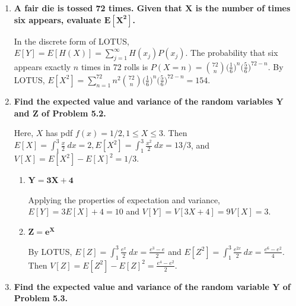 \documentclass[10pt, oneside]{article}
\begin{document}
\begin{enumerate}[label=7.\arabic*]
\item  \begin{tcolorbox}[
  colback=Cerulean!5!white,
  colframe=Cerulean!75!black]
  \textbf{A fair die is tossed 72 times. Given that $\bm{X}$ is the number of times six appears, evaluate $\bm{E[X^2]}$.}
  \end{tcolorbox}
  
In the discrete form of LOTUS, $E[Y] = E[H(X)] = \sum^\infty_{j=1} H(x_j) P(x_j)$. The probability that six appears exactly $n$ times in 72 rolls is $P(X = n) = \binom{72}{n} \big( \frac{1}{6} \big)^n \big( \frac{5}{6} \big)^{72-n} $. By LOTUS, $E[X^2] = \sum^{72}_{n=1} n^2 \binom{72}{n} \big( \frac{1}{6} \big)^n \big( \frac{5}{6} \big)^{72-n}  = \boxed{154}$.

\item  \begin{tcolorbox}[
  colback=Cerulean!5!white,
  colframe=Cerulean!75!black]
  \textbf{Find the expected value and variance of the random variables $\bm{Y}$ and $\bm{Z}$ of Problem 5.2.}
  \end{tcolorbox}
  
  Here, $X$ has pdf $f(x) = 1/2, 1 \leq X \leq 3$. Then $E[X] = \int^3_1 \frac{x}{2} \ dx = 2, E[X^2] = \int^3_1 \frac{x^2}{2} \ dx = 13/3 $, and $V[X] = E[X^2] -  E[X]^2 = 1/3$.
  
	\begin{enumerate}
	\item  \begin{tcolorbox}[
	  colback=Cerulean!5!white,
	  colframe=Cerulean!75!black]
	\textbf{$\bm{Y = 3X + 4}$}
	\end{tcolorbox}
	
	Applying the properties of expectation and variance, $E[Y] = 3 E[X] + 4 = \boxed{10}$ and $V[Y] = V[3X + 4] = 9 V[X] = \boxed{3}$.
	
	\item  \begin{tcolorbox}[
	  colback=Cerulean!5!white,
	  colframe=Cerulean!75!black]
	\textbf{$\bm{Z = e^X}$}
	\end{tcolorbox}
	
	By LOTUS, $E[Z] = \int^3_1 \frac{e^x}{2} \ dx = \boxed{\frac{e^3 - e}{2}}$ and $E[Z^2] = \int^3_1 \frac{e^{2x}}{2} \ dx = \frac{e^6 - e^2}{4}$. Then $V[Z] = E[Z^2] - E[Z]^2 = \boxed{\frac{e^4 - e^2}{2}}$.
	\end{enumerate}

\item  \begin{tcolorbox}[
  colback=Cerulean!5!white,
  colframe=Cerulean!75!black]
  \textbf{Find the expected value and variance of the random variable $\bm{Y}$ of Problem 5.3.}
  \end{tcolorbox}
  

\end{enumerate}
\end{document}
